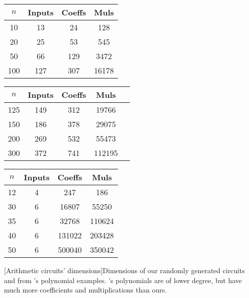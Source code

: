 \begin{table}[htb]\footnotesize
  \centering
  \begin{minipage}[b]{.6\linewidth}
    \centering
    \begin{tabular}{|c|c|c|c|}
      \hline
      $n$  & Inputs & Coeffs   & Muls    \\\hline
      10   & 13     & 24       & 128     \\\hline
      20   & 25     & 53       & 545     \\\hline  
      50   & 66     & 129      & 3472    \\\hline  
      100  & 127    & 307      & 16178   \\\hline  
    \end{tabular}
    \begin{tabular}{|c|c|c|c|c|}
      \hline
      $n$  & Inputs & Coeffs   & Muls    \\\hline
      125  & 149    & 312      & 19766   \\\hline  
      150  & 186    & 378      & 29075   \\\hline  
      200  & 269    & 532      & 55473   \\\hline  
      300  & 372    & 741      & 112195  \\\hline  
    \end{tabular}
  \end{minipage}%
  \begin{minipage}[b]{.4\linewidth}
    \centering
    \begin{tabular}{|c|c|c|c|}
      \hline
      $n$ & Inputs & Coeffs   & Muls    \\\hline
      12  & 4      & 247      & 186     \\\hline  
      30  & 6      & 16807    & 55250   \\\hline  
      35  & 6      & 32768    & 110624  \\\hline  
      40  & 6      & 131022   & 203428  \\\hline  
      50  & 6      & 500040   & 350042  \\\hline  
    \end{tabular}%
  \end{minipage}%
  [Arithmetic circuits' dimensions]{Dimensions of our randomly
    generated circuits and from 's
    polynomial examples. 's
    polynomials are of lower degree, but have much more coefficients and
    multiplications than ours.}\label{tab:circuits}
\end{table}
